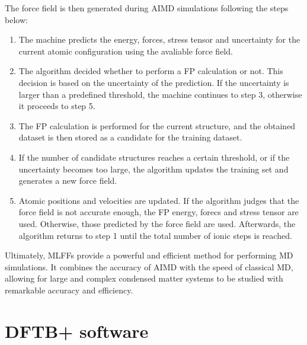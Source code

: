 The force field is then generated during AIMD simulations following 
the steps below:
\begin{enumerate}
    \item The machine predicts the energy, forces, stress tensor 
    and uncertainty for the current atomic configuration using 
    the avaliable force field. 

    \item The algorithm decided whether to perform a FP calculation
    or not. This decision is based on the uncertainty of the prediction. 
    If the uncertainty is larger than a predefined threshold, the machine 
    continues to step 3, otherwise it proceeds to step 5. 

    \item The FP calculation is performed for the current structure, and the 
    obtained dataset is then stored as a candidate for the training 
    dataset. 

    \item If the number of candidate structures reaches a certain threshold, or if 
    the uncertainty becomes too large, the algorithm updates the training 
    set and generates a new force field. 

    \item Atomic positions and velocities are updated. If the algorithm 
    judges that the force field is not accurate enough, the FP energy, forecs 
    and stress tensor are used. Otherwise, those predicted by 
    the force field are used. Afterwards, the algorithm returns to step 
    1 until the total number of ionic steps is reached.
\end{enumerate}

Ultimately, MLFFs provide a powerful and efficient method for performing 
MD simulations. It combines the accuracy of AIMD with the speed of classical
MD, allowing for large and complex condensed matter systems 
to be studied with  remarkable accuracy and efficiency.

 
\section{DFTB+ software}


